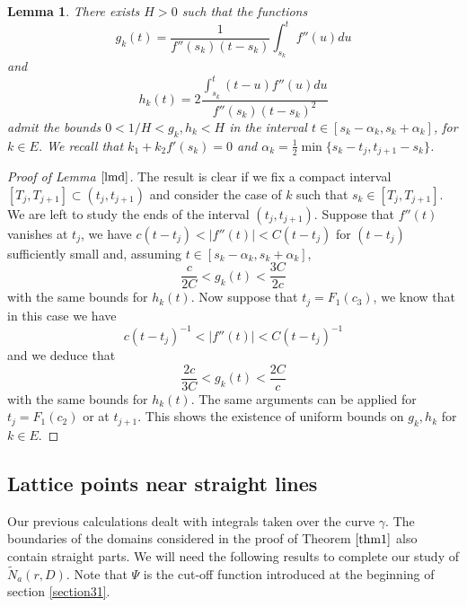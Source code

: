 \documentclass[12pt]{amsart}
\numberwithin{equation}{subsection}
\theoremstyle{definition}
\theoremstyle{plain}
\newtheorem{lemma}[equation]{Lemma}
\begin{document}
\begin{lemma}
\label{lmd}
There exists $H>0$ such that the functions
$$
g_{k}(t) = \frac{1}{f''(s_k)(t-s_k)}\int_{s_k}^t f''(u)du
$$
and
$$
h_k(t) = 2\frac{\int_{s_k}^t (t-u)f''(u)du}{f''(s_k)(t-s_k)^2}
$$
admit the bounds $0 < 1/H < g_k, h_k < H$ in the interval $t \in [s_k-\alpha_k,s_k +\alpha_k]$, for $k \in E$.
We recall that $k_1+k_2 f'(s_k) = 0$ and $\alpha_k= \frac{1}{2}\min \{ s_k - t_j, t_{j+1}-s_k \}$.
\end{lemma}
\begin{proof}[Proof of Lemma $\ref{lmd}$]
The result is clear if we fix a compact interval $[T_j,T_{j+1}] \subset (t_j,t_{j+1})$ and consider the case of $k$ such
that $s_k \in [T_j,T_{j+1}]$. We are left to study the ends of the interval $(t_j,t_{j+1})$. Suppose that $f''(t)$ vanishes at $t_j$, we have $c(t-t_j) < |f''(t)| < C(t-t_j)$ for $(t-t_j)$ sufficiently small and, assuming $t \in [s_k-\alpha_k,s_k +\alpha_k]$,
$$
\frac{c}{2C} < g_k(t) < \frac{3C}{2c}
$$
with the same bounds for $h_k(t)$. Now suppose that $t_j = F_1(c_3)$, we know that in this case we have
\[
c (t-t_j)^{-1} < |f''(t)| < C(t-t_j)^{-1}
\]
and we deduce that
$$
\frac{2c}{3C} < g_k(t) < \frac{2C}{c}
$$
with the same bounds for $h_k(t)$.
The same arguments can be applied for $t_j=F_1(c_2)$ or at $t_{j+1}$.
This shows the existence of uniform bounds on $g_k,h_k$ for $k \in E$.
\end{proof}

\subsection{Lattice points near straight lines}
\label{straight}
Our previous calculations dealt with integrals taken over the curve $\gamma$.
The boundaries of the domains considered in the proof of Theorem $\ref{thm1}$ also contain
straight parts.
We will need the following results to complete our study of $\tilde{N}_a(r,D)$.
Note that $\Psi$ is the cut-off function introduced at the beginning of section \ref{section31}.
\end{document}
